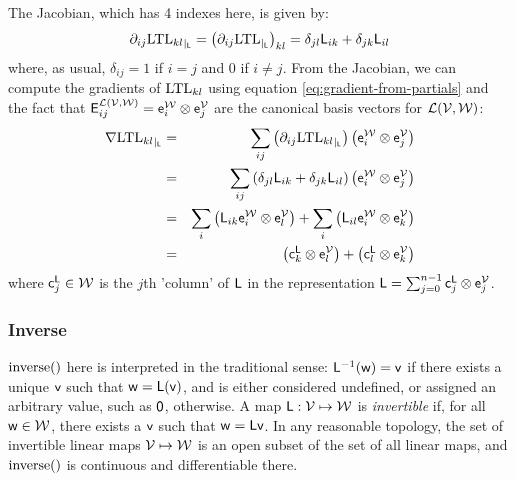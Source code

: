 The Jacobian, which has 4 indexes here, is given by:
\begin{equation}
{\partial}_{ij}{\mathrm{LTL}_{kl}}_{\mid_{\mathsf{L}}}
 =
\left( {\partial}_{ij}{\mathrm{LTL}}_{\mid_{\mathsf{L}}} \right)_{kl}
=
\delta_{jl} \mathsf{L}_{ik}
+
\delta_{jk} \mathsf{L}_{il}
\end{equation}
where, as usual, $\delta_{ij} = 1$ if $i=j$ and  $0$ if $i \neq j$.
From the Jacobian, we can compute the gradients of $\mathrm{LTL}_{kl}$
using equation \ref{eq:gradient-from-partials}
and the fact that
$\mathsf{E}_{ij}^{\mathcal{L}(\mathcal{V},\mathcal{W})}  = \mathsf{e}_i^{\mathcal{W}} \otimes \mathsf{e}_j^{\mathcal{V}}$
are the canonical basis vectors for $\mathcal{L}(\mathcal{V},\mathcal{W})$:
\begin{eqnarray}
{\mathbf \nabla}{\mathrm{LTL}_{kl}}_{\mid_{\mathsf{L}}}
& = &
\sum_{ij}
\left( {\partial}_{ij}{\mathrm{LTL}_{kl}}_{\mid_{\mathsf{L}}} \right)
\left( \mathsf{e}_i^{\mathcal{W}} \otimes \mathsf{e}_j^{\mathcal{V}} \right)
\\
& = &
\sum_{ij}
\left( \delta_{jl} \mathsf{L}_{ik} + \delta_{jk} \mathsf{L}_{il} \right)
\left( \mathsf{e}_i^{\mathcal{W}} \otimes \mathsf{e}_j^{\mathcal{V}} \right)
\nonumber
\\
& = &
\sum_{i}
\left(
\mathsf{L}_{ik}  \mathsf{e}_i^{\mathcal{W}} \otimes \mathsf{e}_l^{\mathcal{V}}
\right)
+
\sum_{i}
\left(
\mathsf{L}_{il}  \mathsf{e}_i^{\mathcal{W}} \otimes \mathsf{e}_k^{\mathcal{V}}
\right)
\nonumber
\\
& = &
\left(
\mathsf{c}_k^{\mathsf{L}} \otimes \mathsf{e}_l^{\mathcal{V}}
\right)
+
\left(
\mathsf{c}_l^{\mathsf{L}} \otimes \mathsf{e}_k^{\mathcal{V}}
\right)
\nonumber
\end{eqnarray}
where $\mathsf{c}_j^{\mathsf{L}} \in \mathcal{W}$ is the $j$th 'column' of $\mathsf{L}$
in the representation
$\mathsf{L} = \sum_{j=0}^{n-1} \mathsf{c}_j^{\mathsf{L}} \otimes \mathsf{e}_j^{\mathcal{V}}$.


\subsubsection{Inverse}
\label{sec:Derivative-of-inverse}

$\mathrm{inverse}()$ here is interpreted in the traditional sense:
$\mathsf{L}^{-1}(\mathsf{w}) = \mathsf{v}$ if there exists a unique $\mathsf{v}$ such that $\mathsf{w} = \mathsf{L}(\mathsf{v})$,
and is either considered undefined, or assigned an arbitrary
value, such as ${\mathsf 0}$, otherwise.
A map $\mathsf{L} : \mathcal{V} \mapsto \mathcal{W}$ is {\it invertible}
if, for all $\mathsf{w} \in \mathcal{W}$, there exists a $\mathsf{v}$ such that
$\mathsf{w} = \mathsf{L} \mathsf{v}$.
In any reasonable topology,
the set of invertible linear maps $\mathcal{V} \mapsto \mathcal{W}$
is an open subset of the set of all linear maps,
and $\mathrm{inverse}()$ is continuous and differentiable there.

